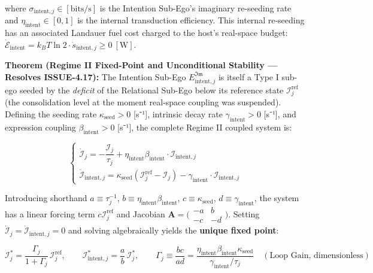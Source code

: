 \documentclass[11pt,a4paper]{article}
\theoremstyle{definition}
\theoremstyle{remark}
\begin{document}
where $\sigma_{\text{intent},j} \in [\text{bits/s}]$ is the Intention Sub-Ego's imaginary re-seeding rate and $\eta_{\text{intent}} \in [0,1]$ is the internal transduction efficiency. This internal re-seeding has an associated Landauer fuel cost charged to the host's real-space budget: $\dot{\mathcal{E}}_{\text{intent}} = k_B T \ln 2 \cdot \dot{s}_{\text{intent},j} \geq 0 \ [\text{W}]$.

\textbf{Theorem (Regime II Fixed-Point and Unconditional Stability — Resolves ISSUE-4.17):} The Intention Sub-Ego $E_{\text{intent},j}^{\mathfrak{Im}}$ is itself a Type I sub-ego seeded by the \textit{deficit} of the Relational Sub-Ego below its reference state $\mathcal{I}_j^{\text{ref}}$ (the consolidation level at the moment real-space coupling was suspended). Defining the seeding rate $\kappa_{\text{seed}} > 0$ [s⁻¹], intrinsic decay rate $\gamma_{\text{intent}} > 0$ [s⁻¹], and expression coupling $\beta_{\text{intent}} > 0$ [s⁻¹], the complete Regime II coupled system is:


\begin{equation}
\begin{cases} \dot{\mathcal{I}}_j = -\dfrac{\mathcal{I}_j}{\tau_j} + \eta_{\text{intent}}\beta_{\text{intent}} \cdot \mathcal{I}_{\text{intent},j} \\[8pt] \dot{\mathcal{I}}_{\text{intent},j} = \kappa_{\text{seed}}\!\left(\mathcal{I}_j^{\text{ref}} - \mathcal{I}_j\right) - \gamma_{\text{intent}} \cdot \mathcal{I}_{\text{intent},j} \end{cases}
\end{equation}


Introducing shorthand $a \equiv \tau_j^{-1}$, $b \equiv \eta_{\text{intent}}\beta_{\text{intent}}$, $c \equiv \kappa_{\text{seed}}$, $d \equiv \gamma_{\text{intent}}$, the system has a linear forcing term $c\mathcal{I}_j^{\text{ref}}$ and Jacobian $\mathbf{A} = \bigl(\begin{smallmatrix} -a & b \\ -c & -d \end{smallmatrix}\bigr)$. Setting $\dot{\mathcal{I}}_j = \dot{\mathcal{I}}_{\text{intent},j} = 0$ and solving algebraically yields the \textbf{unique fixed point}:


\begin{equation}
\boxed{\mathcal{I}_j^* = \frac{\Gamma_j}{1 + \Gamma_j}\,\mathcal{I}_j^{\text{ref}}, \qquad \mathcal{I}_{\text{intent},j}^* = \frac{a}{b}\,\mathcal{I}_j^*, \qquad \Gamma_j \equiv \frac{bc}{ad} = \frac{\eta_{\text{intent}}\beta_{\text{intent}}\kappa_{\text{seed}}}{\gamma_{\text{intent}}/\tau_j} \quad (\text{Loop Gain, dimensionless})}
\end{equation}
\end{document}

